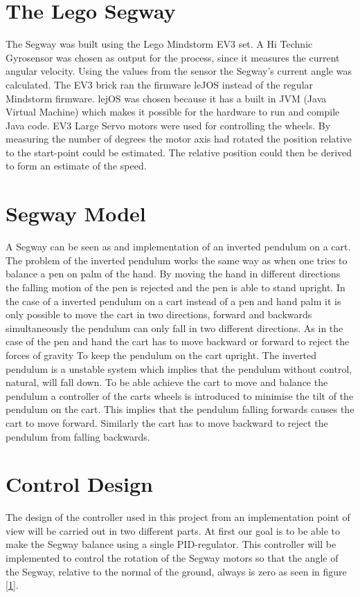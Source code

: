  \section{The Lego Segway}
 The Segway was built using the Lego Mindstorm EV3 set. A Hi Technic Gyrosensor was chosen as output for the process, since it measures the current angular velocity. Using the values from the sensor the Segway's current angle was calculated. The EV3 brick ran the firmware leJOS instead of the regular Mindstorm firmware. lejOS was chosen because it has a built in JVM (Java Virtual Machine) which makes it possible for the hardware to run and compile Java code. EV3 Large Servo motors were used for controlling the wheels. By measuring the number of degrees the motor axis had rotated the position relative to the start-point could be estimated. The relative position could then be derived to form an estimate of the speed. 

\section{Segway Model}
A Segway can be seen as and implementation of an inverted pendulum on a cart. The problem of the inverted pendulum works the same way as when one tries to balance a pen on palm of the hand. By moving the hand in different directions the falling motion of the pen is rejected and the pen is able to stand upright. In the case of a inverted pendulum on a cart instead of a pen and hand palm it is only possible to move the cart in two directions, forward and backwards simultaneously the pendulum can only fall in two different directions. As in the case of the pen and hand the cart has to move backward or forward to reject the forces of gravity To keep the pendulum on the cart upright. The inverted pendulum is a unstable system which implies that the pendulum without control, natural, will fall down. To be able achieve the cart to move and balance the pendulum a controller of the carts wheels is introduced to minimise the tilt of the pendulum on the cart. This implies that the pendulum falling forwards causes the cart to move forward. Similarly the cart has to move backward to reject the pendulum from falling backwards. 


\section{Control Design}
The design of the controller used in this project from an implementation point of view will be carried out in two different parts. 
At first our goal is to be able to make the Segway balance using a single PID-regulator. This controller will be implemented to control the rotation of the Segway motors so that the angle of the Segway, relative to the normal of the ground, always is zero as seen in figure \ref{1}.

